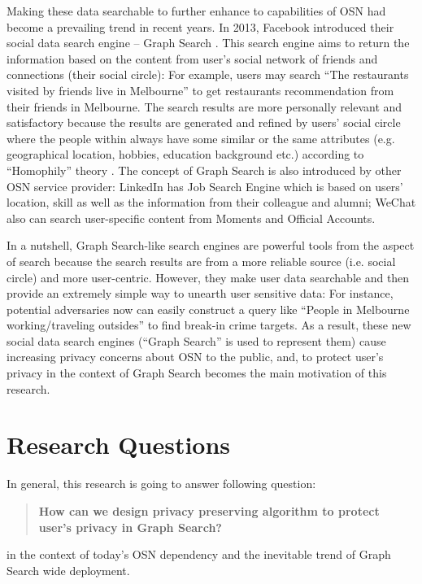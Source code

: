 Making these data searchable to further enhance to capabilities of OSN had become a prevailing trend in recent years. In 2013, Facebook introduced their social data search engine -- Graph Search \cite{facebook2013graph}. This search engine aims to return the information based on the content from user's social network of friends and connections (their social circle): For example, users may search ``The restaurants visited by friends live in Melbourne'' to get restaurants recommendation from their friends in Melbourne. The search results are more personally relevant and satisfactory because the results are generated and refined by users' social circle where the people within always have some similar or the same attributes (e.g. geographical location, hobbies, education background etc.) according to ``Homophily'' theory \cite{mcpherson2001birds}. The concept of Graph Search is also introduced by other OSN service provider: LinkedIn has Job Search Engine which is based on users' location, skill as well as the information from their colleague and alumni; WeChat also can search user-specific content from Moments and Official Accounts. 

In a nutshell, Graph Search-like search engines are powerful tools from the aspect of search because the search results are from a more reliable source (i.e. social circle) and more user-centric. However, they make user data searchable and then provide an extremely simple way to unearth user sensitive data: For instance, potential adversaries now can easily construct a query like ``People in Melbourne working/traveling outsides'' to find break-in crime targets. As a result, these new social data search engines (``Graph Search'' is used to represent them) cause increasing privacy concerns about OSN to the public, and, to protect user's privacy in the context of Graph Search becomes the main motivation of this research.

\section{Research Questions}
In general, this research is going to answer following question:
\begin{quotation}
{ \bf How can we design privacy preserving algorithm to protect user's privacy in Graph Search?}
\end{quotation}
in the context of today's OSN dependency and the inevitable trend of Graph Search wide deployment.

